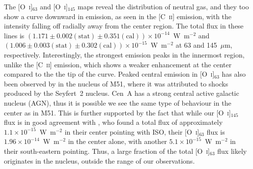 The [O~\textsc{i}]$_{63}$ and [O~\textsc{i}]$_{145}$ maps reveal the distribution of neutral gas, and they too show a curve downward in emission, as seen in the [C~\textsc{ii}] emission, with the intensity falling off radially away from the center region.  The total flux in these lines is $(1.171 \pm 0.002 (\mathrm{stat}) \pm 0.351 (\mathrm{cal})) \times 10^{-14}$~W~m$^{-2}$ and $(1.006 \pm 0.003 (\mathrm{stat}) \pm 0.302 (\mathrm{cal})) \times 10^{-15}$~W~m$^{-2}$ at 63 and 145~$\mu$m, respectively.  Interestingly, the strongest emission peaks in the innermost region, unlike the [C~\textsc{ii}] emission, which shows a weaker enhancement at the center compared to the the tip of the curve.  Peaked central emission in [O~\textsc{i}]$_{63}$ has also been observed by \citet{parkin_2013} in the nucleus of M51, where it was attributed to shocks produced by the Seyfert~2 nucleus.  Cen~A has a strong central active galactic nucleus (AGN), thus it is possible we see the same type of behaviour in the center as in M51.  This is further supported by the fact that while our [O~\textsc{i}]$_{145}$ flux is in good agreement with \citet{2000A&A...355..885U}, who found a total flux of approximately $1.1 \times 10^{-15}$~W~m$^{-2}$ in their center pointing with ISO, their [O~\textsc{i}]$_{63}$ flux is $1.96 \times 10^{-14}$~W~m$^{-2}$ in the center alone, with another $5.1 \times 10^{-15}$~W~m$^{-2}$ in their south-eastern pointing.  Thus, a large fraction of the total [O~\textsc{i}]$_{63}$ flux likely originates in the nucleus, outside the range of our observations.

